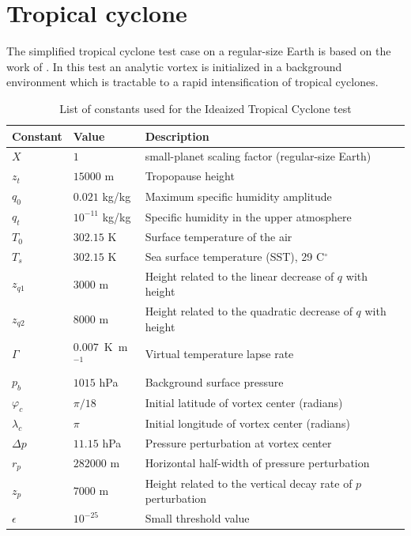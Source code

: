 \documentclass[times,doublespace]{fldauth}
\begin{document}
\clearpage

\section{Tropical cyclone} \label{sec:tropical_cyclone}

The simplified tropical cyclone test case on a regular-size Earth is based on the work of \cite{reed2012idealized, reed2011analytic,reed2011impact, reed2011assessing}.  In this test an analytic vortex is initialized in a background environment which is tractable to a rapid intensification of tropical cyclones.  

\begin{table}[h]

\caption{List of constants used for the Ideaized Tropical Cyclone test}

\begin{tabular*}{\textwidth}{@{\extracolsep{\fill}}lll}
\hline Constant & Value & Description \\
\hline
$X$ & $1$ & small-planet scaling factor (regular-size Earth)\\
$z_t$ & $15000$ m & Tropopause height \\
$q_0$ & $0.021$ kg/kg & Maximum specific humidity amplitude \\
$q_t$ & $10^{-11}$ kg/kg & Specific humidity in the upper atmosphere \\
$T_0$ & $302.15$ K & Surface temperature of the air \\
$T_s$ & $302.15$ K & Sea surface temperature (SST), 29 C$^\circ$\\
$z_{q1}$ & $3000$ m & Height related to the linear decrease of $q$ with height \\
$z_{q2}$ & $8000$ m & Height related to the quadratic decrease of $q$ with height \\
$\Gamma$ & $0.007$\ K\ m$^{-1}$ & Virtual temperature lapse rate \\
$p_{b}$ & $1015$ hPa & Background surface pressure \\
$\varphi_c$ & $\pi / 18$ & Initial latitude of vortex center (radians) \\
$\lambda_c$ & $\pi$ & Initial longitude of vortex center (radians) \\
$\Delta p$ & $11.15$ hPa & Pressure perturbation at vortex center \\
$r_p$ & $282000$ m & Horizontal half-width of pressure perturbation \\
$z_p$ & $7000$ m & Height related to the vertical decay rate of $p$ perturbation \\
$\epsilon$ & $10^{-25}$ & Small threshold value \\
\hline 
\end{tabular*}

\end{table}
\end{document}
